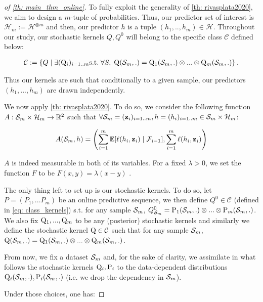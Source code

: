 \begin{proof}[of \cref{th: main_thm_online}]


To fully exploit the generality of \cref{th: rivasplata2020}, we aim to design a $m$-tuple of probabilities. Thus, our predictor set of interest is $\mathcal{H}_m:= \mathcal{H}^{\otimes m}$ and then, our predictor $h$ is a tuple $(h_1,..,h_m)\in\mathcal{H}$. Throughout our study, our stochastic kernels $Q,Q^0$ will belong to the specific class $\mathcal{C}$ defined below:

\begin{align}
  \label{eq: class_kernels}
  \mathcal{C}:= \left\{ Q \mid   \exists (\mathrm{Q}_{i})_{i=1..m}\text{s.t.}\; \forall S,\;  \mathrm{Q}(\mathcal{S}_m,.) = \mathrm{Q}_1(\mathcal{S}_m,.)\otimes...\otimes \mathrm{Q}_m(\mathcal{S}_m,.)      \right\}.
\end{align}


\noindent Thus our kernels are such that conditionally to a given sample, our predictors $(h_1,...,h_m)$ are drawn independently.

\noindent We now apply \cref{th: rivasplata2020}. To do so, we consider the following function $A: \mathcal{S}_m\times \mathcal{H}_m \rightarrow \mathbb{R}^2$ such that $\forall \mathcal{S}_m= (\mathbf{z}_i)_{i=1..m},h= (h_i)_{i=1..m}\in \mathcal{S}_m\times \mathcal{H}_m$:

\[  A(\mathcal{S}_m,h)= \left(\sum_{i=1}^m \mathbb{E}[\ell(h_i,\mathbf{z}_i)\mid \mathcal{F}_{i-1}], \sum_{i=1}^m \ell(h_i,\mathbf{z}_i)  \right)   \]

\noindent $A$ is indeed measurable in both of its variables. For a fixed $\lambda>0$, we set the function $F$ to be $F(x,y)= \lambda(x-y)$ .


 \noindent The only thing left to set up is our stochastic kernels. To do so, let $P=(P_1,...P_m)$ be an online predictive sequence, we then define $Q^0\in\mathcal{C}$ (defined in \cref{eq: class_kernels}) s.t. for any sample $\mathcal{S}_m$, $\\Q_{\mathcal{S}_m}^0 = \mathrm{P}_1(\mathcal{S}_m,.)\otimes...\otimes \mathrm{P}_m(\mathcal{S}_m,.)$. We also fix $\mathrm{Q}_1,...,\mathrm{Q}_m$ to be any (posterior)
 stochastic kernels and similarly we define the stochastic kernel $\mathrm{Q}\in\mathcal{C}$ such that for any sample $\mathcal{S}_m$, $\mathrm{Q}(\mathcal{S}_m,.) = \mathrm{Q}_1(\mathcal{S}_m,.)\otimes...\otimes \mathrm{Q}_m(\mathcal{S}_m,.)$.

 From now, we fix a dataset $\mathcal{S}_m$ and, for the sake of clarity, we assimilate in what follows the stochastic kernels $\mathrm{Q}_{i},\mathrm{P}_{i}$ to the data-dependent distributions $\mathrm{Q}_{i}(\mathcal{S}_m,.), \mathrm{P}_{i}(\mathcal{S}_m,.)$ (i.e. we drop the dependency in $\mathcal{S}_m$).

\noindent Under those choices, one has:


\end{proof}
